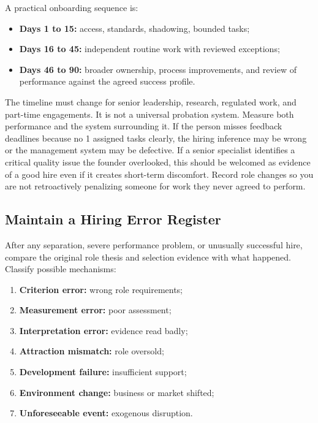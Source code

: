 A practical onboarding sequence is:
\begin{itemize}
    \item \textbf{Days 1 to 15:} access, standards, shadowing, bounded tasks;
    \item \textbf{Days 16 to 45:} independent routine work with reviewed exceptions;
    \item \textbf{Days 46 to 90:} broader ownership, process improvements, and review of performance against the agreed success profile.
\end{itemize}

The timeline must change for senior leadership, research, regulated work, and part-time engagements. It is not a universal probation system. Measure both performance and the system surrounding it. If the person misses feedback deadlines because no 1 assigned tasks clearly, the hiring inference may be wrong or the management system may be defective. If a senior specialist identifies a critical quality issue the founder overlooked, this should be welcomed as evidence of a good hire even if it creates short-term discomfort. Record role changes so you are not retroactively penalizing someone for work they never agreed to perform.

\subsection{Maintain a Hiring Error Register}
\label{sec:hiring_error_register}

After any separation, severe performance problem, or unusually successful hire, compare the original role thesis and selection evidence with what happened. Classify possible mechanisms:
\begin{enumerate}
    \item \textbf{Criterion error:} wrong role requirements;
    \item \textbf{Measurement error:} poor assessment;
    \item \textbf{Interpretation error:} evidence read badly;
    \item \textbf{Attraction mismatch:} role oversold;
    \item \textbf{Development failure:} insufficient support;
    \item \textbf{Environment change:} business or market shifted;
    \item \textbf{Unforeseeable event:} exogenous disruption.
\end{enumerate}


